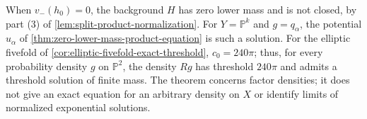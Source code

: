 When $v_-(h_0)=0$, the background $H$ has zero lower mass and is not closed, by part (3) of \cref{lem:split-product-normalization}. For $Y=\mathbb P^k$ and $g=q_\alpha$, the potential $u_\alpha$ of \cref{thm:zero-lower-mass-product-equation} is such a solution. For the elliptic fivefold of \cref{cor:elliptic-fivefold-exact-threshold}, $c_0=240\pi$; thus, for every probability density $g$ on $\mathbb P^2$, the density $Rg$ has threshold $240\pi$ and admits a threshold solution of finite mass. The theorem concerns factor densities; it does not give an exact equation for an arbitrary density on $X$ or identify limits of normalized exponential solutions.
